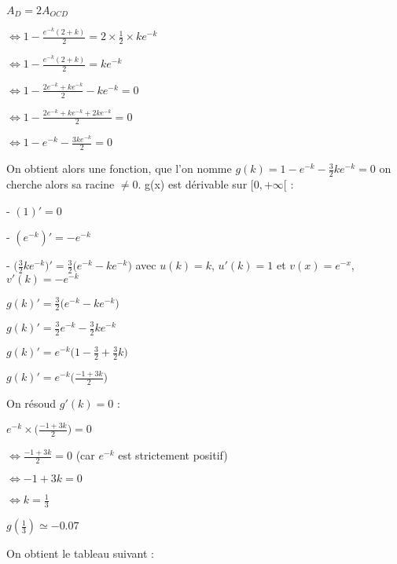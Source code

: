 \documentclass{article}
\begin{document}
$A_D = 2 A_{OCD}$

$\Leftrightarrow 1 - \displaystyle\frac{e^{-k}(2+k)}{2} = 2 \times \displaystyle\frac{1}{2} \times k e^{-k}$

$\Leftrightarrow 1 - \displaystyle\frac{e^{-k}(2+k)}{2} = k e^{-k}$

$\Leftrightarrow 1 - \displaystyle\frac{2e^{-k}+ke^{-k}}{2} - k e^{-k} = 0$

$\Leftrightarrow 1 - \displaystyle\frac{2e^{-k}+ke^{-k} + 2ke^{-k}}{2} = 0$

$\Leftrightarrow 1 - e^{-k} - \displaystyle\frac{3ke^{-k}}{2} = 0$

\noindent On obtient alors une fonction, que l'on nomme $g(k) = 1 - e^{-k} - \displaystyle\frac{3}{2}ke^{-k} = 0$  on cherche alors sa racine $\neq 0$. g(x) est dérivable sur $[0, +\infty[$ :

- $(1)' = 0$

- $(e^{-k})' = -e^{-k}$

- $\Big(\displaystyle\frac{3}{2}ke^{-k}\Big)' = \displaystyle\frac{3}{2}\Big(e^{-k} -ke^{-k}\Big)$  avec $u(k) = k$, $u'(k) = 1$ et $v(x) = e^{-x}$, $v'(k) = -e^{-k}$


$g(k)' = \displaystyle\frac{3}{2}\Big(e^{-k} -ke^{-k}\Big)$

$g(k)' = \displaystyle\frac{3}{2}e^{-k} - \displaystyle\frac{3}{2}ke^{-k}$

$g(k)' = e^{-k}\Big(1-\displaystyle\frac{3}{2} + \displaystyle\frac{3}{2}k \Big)$

$g(k)' = e^{-k}\Big(\displaystyle\frac{-1+3k}{2}\Big)$

\noindent On résoud $g'(k) = 0$ :

$e^{-k} \times \Big(\displaystyle\frac{-1+3k}{2} \Big) = 0$

$\Leftrightarrow \displaystyle\frac{-1+3k}{2} = 0$ (car $e^{-k}$ est strictement positif)

$\Leftrightarrow -1+3k = 0$ 

$\Leftrightarrow k = \displaystyle\frac{1}{3}$ 

$g(\frac{1}{3}) \simeq -0.07$


\vspace{2mm}

\noindent On obtient le tableau suivant :

\vspace{2mm}

{\centering
{}
\par}
\end{document}
